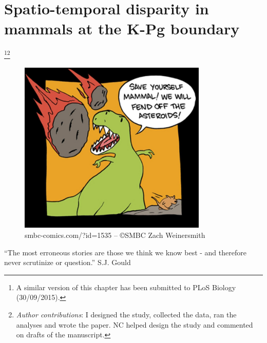 

%
%

\chapter[Spatio-temporal disparity in mammals at the K-Pg boundary]{Spatio-temporal disparity in mammals at the K-Pg boundary}
\label{chap:STD_paper}

\bigskip
\begin{center}

\footnote{A similar version of this chapter has been submitted to PLoS Biology (30/09/2015).}\footnote{\textit{Author contributions}: I designed the study, collected the data, ran the analyses and wrote the paper. NC helped design the study and commented on drafts of the manuscript.} \\

\begin{figure}[h]
  \centering
  \includegraphics[width=0.8\textwidth]{STD/Figures/SMBC-ZachWeinersmith.jpg}
  \caption*{smbc-comics.com/?id=1535 -- \copyright SMBC Zach Weinersmith}
\end{figure}

\begin{quoteshrink}
  ``The most erroneous stories are those we think we know best - and therefore never scrutinize or question.''
\hfill{S.J. Gould}
\end{quoteshrink}
\bigskip


\end{center}
